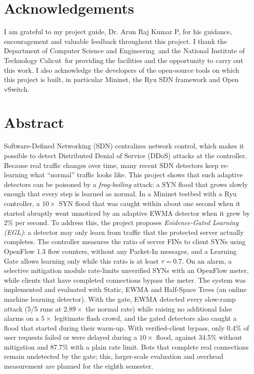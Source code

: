 \documentclass[12pt,a4paper,oneside]{report}
\newcommand{\GuideName}{Dr. Arun Raj Kumar P}
\newcommand{\Department}{Department of Computer Science and Engineering}
\newcommand{\Institute}{National Institute of Technology Calicut}
\begin{document}
\chapter*{Acknowledgements}
I am grateful to my project guide, \GuideName, for his guidance, encouragement and valuable feedback throughout this project. I thank the \Department\ and the \Institute\ for providing the facilities and the opportunity to carry out this work. I also acknowledge the developers of the open-source tools on which this project is built, in particular Mininet, the Ryu SDN framework and Open vSwitch.
\chapter*{Abstract}
Software-Defined Networking (SDN) centralizes network control, which makes it possible to detect Distributed Denial of Service (DDoS) attacks at the controller. Because real traffic changes over time, many recent SDN detectors keep re-learning what ``normal'' traffic looks like. This project shows that such adaptive detectors can be poisoned by a \emph{frog-boiling} attack: a SYN flood that grows slowly enough that every step is learned as normal. In a Mininet testbed with a Ryu controller, a $10\times$ SYN flood that was caught within about one second when it started abruptly went unnoticed by an adaptive EWMA detector when it grew by 2\% per second. To address this, the project proposes \emph{Evidence-Gated Learning (EGL)}: a detector may only learn from traffic that the protected server actually completes. The controller measures the ratio of server FINs to client SYNs using OpenFlow 1.3 flow counters, without any Packet-In messages, and a Learning Gate allows learning only while this ratio is at least $\tau = 0.7$. On an alarm, a selective mitigation module rate-limits unverified SYNs with an OpenFlow meter, while clients that have completed connections bypass the meter. The system was implemented and evaluated with Static, EWMA and Half-Space Trees (an online machine learning detector). With the gate, EWMA detected every slow-ramp attack (5/5 runs at $2.89\times$ the normal rate) while raising no additional false alarms on a $5\times$ legitimate flash crowd, and the gated detectors also caught a flood that started during their warm-up. With verified-client bypass, only 0.4\% of user requests failed or were delayed during a $10\times$ flood, against 34.5\% without mitigation and 87.7\% with a plain rate limit. Bots that complete real connections remain undetected by the gate; this, larger-scale evaluation and overhead measurement are planned for the eighth semester.
\end{document}
